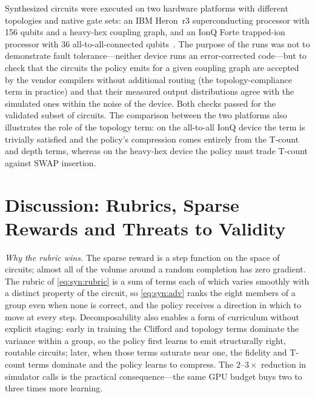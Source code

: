 Synthesized circuits were executed on two hardware platforms with different topologies and native gate sets: an IBM Heron~r3 superconducting processor with 156 qubits and a heavy-hex coupling graph, and an IonQ Forte trapped-ion processor with 36 all-to-all-connected qubits~\cite{guo2026rubriq}. The purpose of the runs was not to demonstrate fault tolerance---neither device runs an error-corrected code---but to check that the circuits the policy emits for a given coupling graph are accepted by the vendor compilers without additional routing (the topology-compliance term in practice) and that their measured output distributions agree with the simulated ones within the noise of the device. Both checks passed for the validated subset of circuits. The comparison between the two platforms also illustrates the role of the topology term: on the all-to-all IonQ device the term is trivially satisfied and the policy's compression comes entirely from the T-count and depth terms, whereas on the heavy-hex device the policy must trade T-count against SWAP insertion.

\section{Discussion: Rubrics, Sparse Rewards and Threats to Validity}\label{sec:syn:rubriq-discussion}

\emph{Why the rubric wins.} The sparse reward is a step function on the space of circuits; almost all of the volume around a random completion has zero gradient. The rubric of \cref{eq:syn:rubric} is a sum of terms each of which varies smoothly with a distinct property of the circuit, so \cref{eq:syn:adv} ranks the eight members of a group even when none is correct, and the policy receives a direction in which to move at every step. Decomposability also enables a form of curriculum without explicit staging: early in training the Clifford and topology terms dominate the variance within a group, so the policy first learns to emit structurally right, routable circuits; later, when those terms saturate near one, the fidelity and T-count terms dominate and the policy learns to compress. The $2$--$3\times$ reduction in simulator calls is the practical consequence---the same GPU budget buys two to three times more learning.

